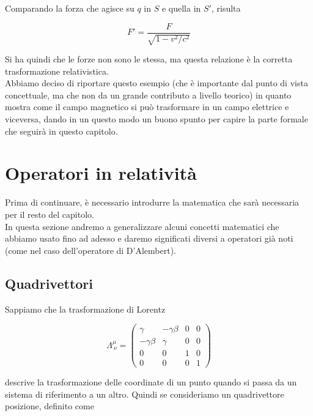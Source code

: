 Comparando la forza che agisce su $q$ in $S$ e quella in $S'$, risulta

\begin{equation}
    F' = \frac{F}{\sqrt{1 - v^2/c^2}}
\end{equation}

Si ha quindi che le forze non sono le stessa, ma questa relazione è la corretta trasformazione relativistica. \\

Abbiamo deciso di riportare questo esempio (che è importante dal punto di vista concettuale, ma che non da un grande contributo a livello teorico) in quanto mostra come il campo magnetico si può trasformare in un campo elettrice e viceversa, dando in un questo modo un buono spunto per capire la parte formale che seguirà in questo capitolo. 

\section{Operatori in relatività}

Prima di continuare, è necessario introdurre la matematica che sarà necessaria per il resto del capitolo. \\
In questa sezione andremo a generalizzare alcuni concetti matematici che abbiamo usato fino ad adesso e daremo significati diversi a operatori già noti (come nel caso dell'operatore di D'Alembert).

\subsection{Quadrivettori}

Sappiamo che la trasformazione di Lorentz 

\begin{tcolorbox}[colback=yellow!10!white, colframe=orange!70!black, boxrule=0.8pt]
\begin{equation}
    \Lambda^\mu_{\ \nu} = 
    \begin{pmatrix} 
        \gamma & -\gamma\beta & 0 & 0 \\ 
        -\gamma\beta & \gamma & 0 & 0 \\ 
        0 & 0 & 1 & 0 \\ 
        0 & 0 & 0 & 1 
    \end{pmatrix}
\end{equation}
\end{tcolorbox}

descrive la trasformazione delle coordinate di un punto quando si passa da un sistema di riferimento a un altro. Quindi se consideriamo un quadrivettore posizione, definito come 

